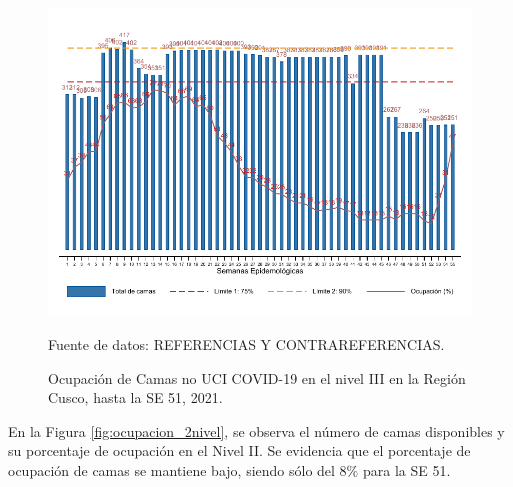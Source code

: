 \documentclass[12pt,a4paper,openany]{book}
\begin{document}
\begin{figure}[htpb]
	\caption{Ocupación de Camas no UCI COVID-19 en el nivel III en la Región Cusco, hasta la SE 51, 2021.}\label{fig:ocupacion_3_nivel}
	\begin{center}
		\includegraphics[width=0.95\linewidth]{../figuras/nivel_3.pdf}
	\end{center}
	{\footnotesize {Fuente de datos: REFERENCIAS Y CONTRAREFERENCIAS.}}
\end{figure}

\clearpage

En la Figura \ref{fig:ocupacion_2nivel}, se observa el número de camas disponibles y su porcentaje de ocupación en el Nivel II. Se evidencia que el porcentaje de ocupación de camas se mantiene bajo, siendo sólo del 8$\%$ para la SE 51. 
\end{document}
